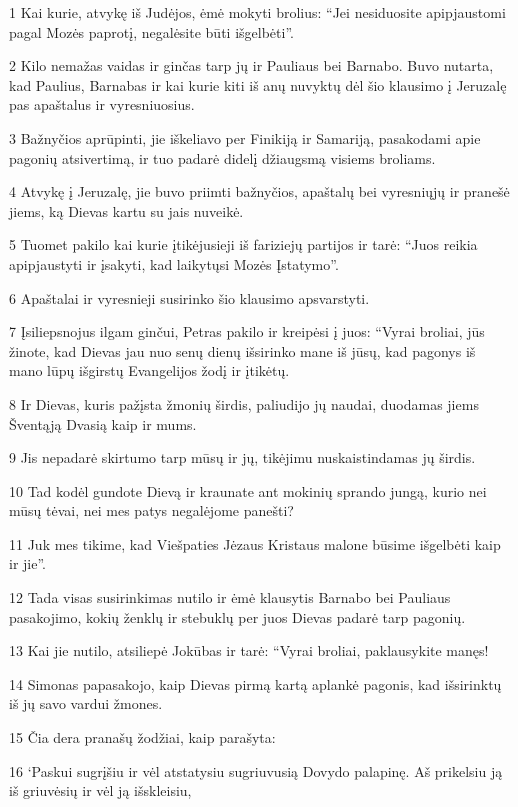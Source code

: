 \par 1 Kai kurie, atvykę iš Judėjos, ėmė mokyti brolius: “Jei nesiduosite apipjaustomi pagal Mozės paprotį, negalėsite būti išgelbėti”. 
\par 2 Kilo nemažas vaidas ir ginčas tarp jų ir Pauliaus bei Barnabo. Buvo nutarta, kad Paulius, Barnabas ir kai kurie kiti iš anų nuvyktų dėl šio klausimo į Jeruzalę pas apaštalus ir vyresniuosius. 
\par 3 Bažnyčios aprūpinti, jie iškeliavo per Finikiją ir Samariją, pasakodami apie pagonių atsivertimą, ir tuo padarė didelį džiaugsmą visiems broliams. 
\par 4 Atvykę į Jeruzalę, jie buvo priimti bažnyčios, apaštalų bei vyresniųjų ir pranešė jiems, ką Dievas kartu su jais nuveikė. 
\par 5 Tuomet pakilo kai kurie įtikėjusieji iš fariziejų partijos ir tarė: “Juos reikia apipjaustyti ir įsakyti, kad laikytųsi Mozės Įstatymo”. 
\par 6 Apaštalai ir vyresnieji susirinko šio klausimo apsvarstyti. 
\par 7 Įsiliepsnojus ilgam ginčui, Petras pakilo ir kreipėsi į juos: “Vyrai broliai, jūs žinote, kad Dievas jau nuo senų dienų išsirinko mane iš jūsų, kad pagonys iš mano lūpų išgirstų Evangelijos žodį ir įtikėtų. 
\par 8 Ir Dievas, kuris pažįsta žmonių širdis, paliudijo jų naudai, duodamas jiems Šventąją Dvasią kaip ir mums. 
\par 9 Jis nepadarė skirtumo tarp mūsų ir jų, tikėjimu nuskaistindamas jų širdis. 
\par 10 Tad kodėl gundote Dievą ir kraunate ant mokinių sprando jungą, kurio nei mūsų tėvai, nei mes patys negalėjome panešti? 
\par 11 Juk mes tikime, kad Viešpaties Jėzaus Kristaus malone būsime išgelbėti kaip ir jie”. 
\par 12 Tada visas susirinkimas nutilo ir ėmė klausytis Barnabo bei Pauliaus pasakojimo, kokių ženklų ir stebuklų per juos Dievas padarė tarp pagonių. 
\par 13 Kai jie nutilo, atsiliepė Jokūbas ir tarė: “Vyrai broliai, paklausykite manęs! 
\par 14 Simonas papasakojo, kaip Dievas pirmą kartą aplankė pagonis, kad išsirinktų iš jų savo vardui žmones. 
\par 15 Čia dera pranašų žodžiai, kaip parašyta: 
\par 16 ‘Paskui sugrįšiu ir vėl atstatysiu sugriuvusią Dovydo palapinę. Aš prikelsiu ją iš griuvėsių ir vėl ją išskleisiu, 
